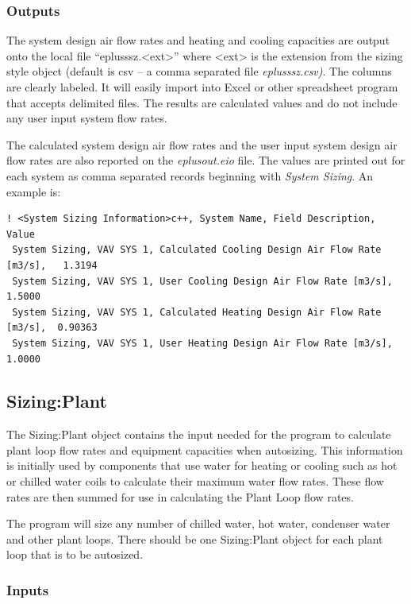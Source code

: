 \subsubsection{Outputs}\label{outputs-2-006}

The system design air flow rates and heating and cooling capacities are output onto the local file ``eplusssz.\textless{}ext\textgreater{}'' where \textless{}ext\textgreater{} is the extension from the sizing style object (default is csv -- a comma separated file \emph{eplusssz.csv)}. The columns are clearly labeled. It will easily import into Excel or other spreadsheet program that accepts delimited files. The results are calculated values and do not include any user input system flow rates.

The calculated system design air flow rates and the user input system design air flow rates are also reported on the \emph{eplusout.eio} file. The values are printed out for each system as comma separated records beginning with \emph{System Sizing}. An example is:

\begin{lstlisting}
! <System Sizing Information>c++, System Name, Field Description, Value
 System Sizing, VAV SYS 1, Calculated Cooling Design Air Flow Rate [m3/s],   1.3194
 System Sizing, VAV SYS 1, User Cooling Design Air Flow Rate [m3/s],   1.5000
 System Sizing, VAV SYS 1, Calculated Heating Design Air Flow Rate [m3/s],  0.90363
 System Sizing, VAV SYS 1, User Heating Design Air Flow Rate [m3/s],   1.0000
\end{lstlisting}

\subsection{Sizing:Plant}\label{sizingplant}

The Sizing:Plant object contains the input needed for the program to calculate plant loop flow rates and equipment capacities when autosizing. This information is initially used by components that use water for heating or cooling such as hot or chilled water coils to calculate their maximum water flow rates. These flow rates are then summed for use in calculating the Plant Loop flow rates.

The program will size any number of chilled water, hot water, condenser water and other plant loops. There should be one Sizing:Plant object for each plant loop that is to be autosized.

\subsubsection{Inputs}\label{inputs-7-006}

